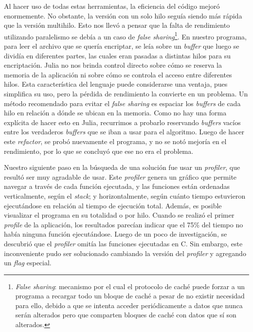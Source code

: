 \documentclass[11pt]{article}
\newcommand{\english}[1]{\textit{#1}}
\begin{document}
Al hacer uso de todas estas herramientas, la eficiencia del código mejoró enormemente. No obstante, la versión con un solo hilo seguía siendo más rápida que la versión multihilo. Esto nos llevó a pensar que la falta de rendimiento utilizando paralelismo se debía a un caso de \english{false sharing}\footnote{\english{False sharing}: mecanismo por el cual el protocolo de caché puede forzar a un programa a recargar todo un bloque de caché a pesar de no existir necesidad para ello, debido a que se intenta acceder periódicamente a datos que nunca serán alterados pero que comparten bloques de caché con datos que sí son alterados.}. En nuestro programa, para leer el archivo que se quería encriptar, se leía sobre un \english{buffer} que luego se dividía en diferentes partes, las cuales eran pasadas a distintas hilos para su encriptación. Julia no nos brinda control directo sobre cómo se reserva la memoria de la aplicación ni sobre cómo se controla el acceso entre diferentes hilos. Esta característica del lenguaje puede considerarse una ventaja, pues simplifica su uso, pero la pérdida de rendimiento la convierte en un problema. Un método recomendado para evitar el \english{false sharing} es espaciar los \english{buffers} de cada hilo en relación a dónde se ubican en la memoria. Como no hay una forma explícita de hacer esto en Julia, recurrimos a probarlo reservando \english{buffers} vacíos entre los verdaderos \english{buffers} que se iban a usar para el algoritmo. Luego de hacer este \english{refactor}, se probó nuevamente el programa, y no se notó mejoría en el rendimiento, por lo que se concluyó que ese no era el problema.

Nuestro siguiente paso en la búsqueda de una solución fue usar un \english{profiler}, que resultó ser muy agradable de usar. Este \english{profiler} genera un gráfico que permite navegar a través de cada función ejecutada, y las funciones están ordenadas verticalmente, según el \english{stack}; y horizontalmente, según cuánto tiempo estuvieron ejecutándose en relación al tiempo de ejecución total. Además, es posible visualizar el programa en su totalidad o por hilo. Cuando se realizó el primer \english{profile} de la aplicación, los resultados parecían indicar que el 75\% del tiempo no había ninguna función ejecutándose. Luego de un poco de investigación, se descubrió que el \english{profiler} omitía las funciones ejecutadas en C. Sin embargo, este inconveniente pudo ser solucionado cambiando la versión del \english{profiler} y agregando un \english{flag} especial.
\end{document}
